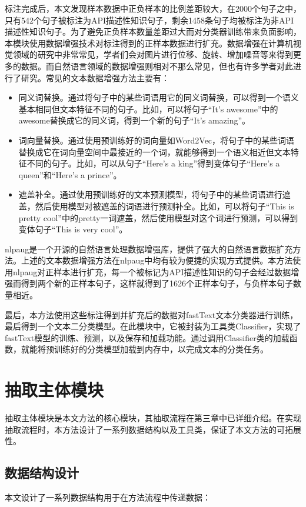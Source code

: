 标注完成后，本文发现样本数据中正负样本的比例差距较大，在2000个句子之中，只有542个句子被标注为API描述性知识句子，剩余1458条句子均被标注为非API描述性知识句子。为了避免正负样本数量差距过大而对分类器训练带来负面影响，本模块使用数据增强技术对标注得到的正样本数据进行扩充。数据增强在计算机视觉领域的研究中非常常见，学者们会对图片进行位移、旋转、增加噪音等来得到更多的数据。而自然语言领域的数据增强则相对不那么常见，但也有许多学者对此进行了研究。常见的文本数据增强方法主要有：
\begin{itemize}
    \item 同义词替换。通过将句子中的某些词语用它的同义词替换，可以得到一个语义基本相同但文本特征不同的句子。比如，可以将句子“It's awesome”中的awesome替换成它的同义词，得到一个新的句子“It's amazing”。
    \item 词向量替换。通过使用预训练好的词向量如Word2Vec，将句子中的某些词语替换成它在词向量空间中最接近的一个词，就能够得到一个语义相近但文本特征不同的句子。比如，可以从句子“Here's a king”得到变体句子“Here's a queen”和“Here's a prince”。
    \item 遮盖补全。通过使用预训练好的文本预测模型，将句子中的某些词语进行遮盖，然后使用模型对被遮盖的词语进行预测补全。比如，可以将句子“This is pretty cool”中的pretty一词遮盖，然后使用模型对这个词进行预测，可以得到变体句子“This is very cool”。
\end{itemize}

nlpaug是一个开源的自然语言处理数据增强库，提供了强大的自然语言数据扩充方法。上述的文本数据增强方法在nlpaug中均有较为便捷的实现方式提供。本方法使用nlpaug对正样本进行扩充，每一个被标记为API描述性知识的句子会经过数据增强而得到两个新的正样本句子，这样就得到了1626个正样本句子，与负样本句子数量相近。

最后，本方法使用这些标注得到并扩充后的数据对fastText文本分类器进行训练，最后得到一个文本二分类模型。在此模块中，它被封装为工具类Classifier，实现了fastText模型的训练、预测，以及保存和加载功能。通过调用Classifier类的加载函数，就能将预训练好的分类模型加载到内存中，以完成文本的分类任务。
\section{抽取主体模块}
抽取主体模块是本文方法的核心模块，其抽取流程在第三章中已详细介绍。在实现抽取流程时，本方法设计了一系列数据结构以及工具类，保证了本文方法的可拓展性。

\subsection{数据结构设计}
本文设计了一系列数据结构用于在方法流程中传递数据：

